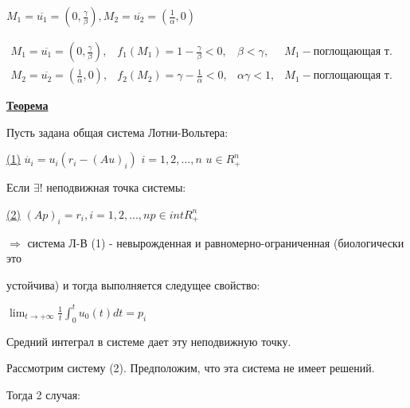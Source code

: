 \newpage
$M_1 = \overline{u_1} = (0 , \frac{\gamma}{\beta}),$\hspace{0.2cm}$M_2 = \overline{u_2} = (\frac{1}{\alpha} , 0)$

\vspace{0.5cm}
$
	\begin{matrix}
	M_1 = \overline{u_1} = (0 , \frac{\gamma}{\beta}), & f_1(M_1) = 1 - \frac{\gamma}{\beta} < 0,&\beta < \gamma,  & M_1- {\text {поглощающая т.}}\\
	M_2 = \overline{u_2} = (\frac{1}{\alpha} , 0), & f_2(M_2) = \gamma - \frac{1}{\alpha}<0,&\alpha\gamma < 1, & M_1- {\text {поглощающая т.}}
	\end{matrix}
$


\vspace{0.5cm}
\textbf{\underline{Теорема}}

Пусть задана общая система Лотни-Вольтера:

\underline{(1)} $\dot{u_i} = u_i(r_i - (Au)_i)$ \hspace{0.2cm} $i = 1,2,...,n$ \hspace{0.2cm} $u \in R_+^n$
 
Если $\exists ! $ неподвижная точка системы:

\underline{(2)} $(Ap)_i = r_i, $\hspace{0.2cm}$ i = 1,2,...,n$\hspace{0.2cm}$ p \in intR_+^n$


$\Rightarrow$ система Л-В (1) - невырожденная и равномерно-ограниченная (биологически это

устойчива) и тогда выполняется следущее свойство:

\vspace{0.2cm}
\begin{center}
\begin{Large}
$
\lim_{t \to +\infty} \frac{1}{t}\int_0^t u_0(t)dt = p_i
$
\end{Large}

\end{center}
\begin{figure} [h!]
			\caption{}	
\end{figure} 

Средний интеграл в системе дает эту неподвижную точку.

\vspace{0.5cm}
Рассмотрим систему (2). Предположим, что эта система не имеет решений.

Тогда 2 случая:

